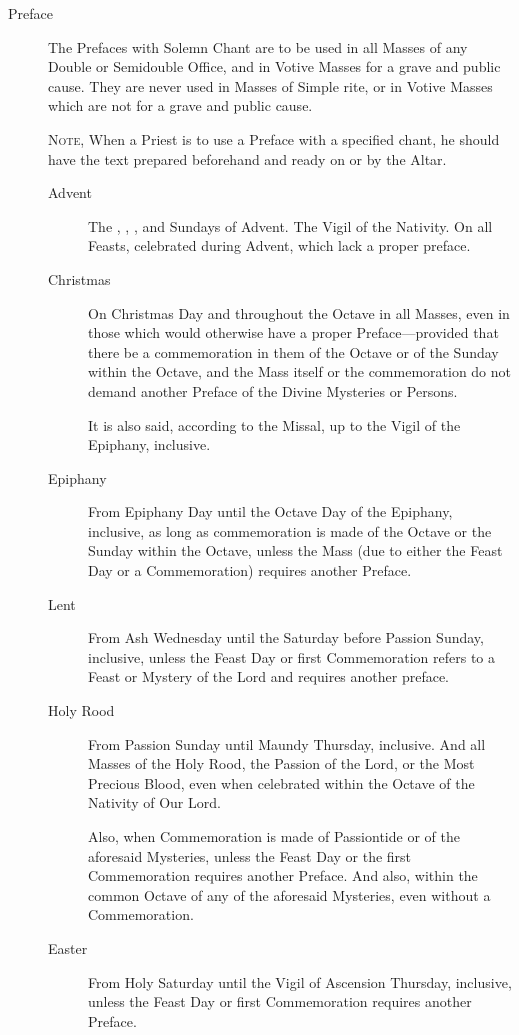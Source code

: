 \begin{description}
    \item[Preface] The Prefaces with Solemn Chant are to be used in all Masses of any Double or Semidouble Office, and in Votive Masses for a grave and public cause. They are never used in Masses of Simple rite, or in Votive Masses which are not for a grave and public cause.\par
    \textsc{Note,} When a Priest is to use a Preface with a specified chant, he should have the text prepared beforehand and ready on or by the Altar.\par
        \begin{description}
            \item[Advent] The , , , and  Sundays of Advent. The Vigil of the Nativity. On all Feasts, celebrated during Advent, which lack a proper preface.
            \item[Christmas] On Christmas Day and throughout the Octave in all Masses, even in those which would otherwise have a proper Preface---provided that there be a commemoration in them of the Octave or of the Sunday within the Octave, and the Mass itself or the commemoration do not demand another Preface of the Divine Mysteries or Persons.\par
            It is also said, according to the Missal, up to the Vigil of the Epiphany, inclusive.
            \item[Epiphany] From Epiphany Day until the Octave Day of the Epiphany, inclusive, as long as commemoration is made of the Octave or the Sunday within the Octave, unless the Mass (due to either the Feast Day or a Commemoration) requires another Preface.
            \item[Lent] From Ash Wednesday until the Saturday before Passion Sunday, inclusive, unless the Feast Day or first Commemoration refers to a Feast or Mystery of the Lord and requires another preface.
            \item[Holy Rood] From Passion Sunday until Maundy Thursday, inclusive. And all Masses of the Holy Rood, the Passion of the Lord, or the Most Precious Blood, even when celebrated within the Octave of the Nativity of Our Lord.\par
            Also, when Commemoration is made of Passiontide or of the aforesaid Mysteries, unless the Feast Day or the first Commemoration requires another Preface. And also, within the common Octave of any of the aforesaid Mysteries, even without a Commemoration.
            \item[Easter] From Holy Saturday until the Vigil of Ascension Thursday, inclusive, unless the Feast Day or first Commemoration requires another Preface.\par

\end{description}
\end{description}
